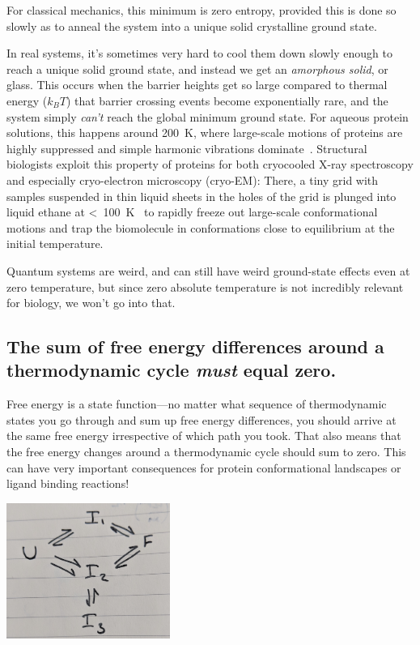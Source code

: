 \documentclass[english,course]{lecture}
\begin{document}
For classical mechanics, this minimum is zero entropy, provided this is done so slowly as to anneal the system into a unique solid crystalline ground state.

In real systems, it's sometimes very hard to cool them down slowly enough to reach a unique solid ground state, and instead we get an \emph{amorphous solid}, or glass.
This occurs when the barrier heights get so large compared to thermal energy ($k_B T$) that barrier crossing events become exponentially rare, and the system simply \emph{can't} reach the global minimum ground state.
For aqueous protein solutions, this happens around 200~K, where large-scale motions of proteins are highly suppressed and simple harmonic vibrations dominate~\cite{ringe2003glass}.
Structural biologists exploit this property of proteins for both cryocooled X-ray spectroscopy and especially cryo-electron microscopy (cryo-EM): There, a tiny grid with samples suspended in thin liquid sheets in the holes of the grid is plunged into liquid ethane at <~100~K~\cite{russo2016precision} to rapidly freeze out large-scale conformational motions and trap the biomolecule in conformations close to equilibrium at the initial temperature.

Quantum systems are weird, and can still have weird ground-state effects even at zero temperature, but since zero absolute temperature is not incredibly relevant for biology, we won't go into that.

\subsection{The sum of free energy differences around a thermodynamic cycle \emph{must} equal zero.}

Free energy is a state function---no matter what sequence of thermodynamic states you go through and sum up free energy differences, you should arrive at the same free energy irrespective of which path you took.
That also means that the free energy changes around a thermodynamic cycle should sum to zero.
This can have very important consequences for protein conformational landscapes or ligand binding reactions!


\begin{centering}
\includegraphics[width=0.4\textwidth]{figures/protein-folding-mechanism.jpg}

\end{centering}
\end{document}

